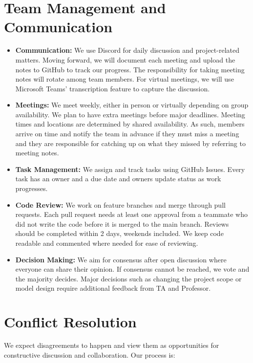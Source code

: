 \documentclass[12pt]{article}
\begin{document}
\section{Team Management and Communication}

\begin{itemize}
  \item \textbf{Communication:} We use Discord for daily discussion and project-related matters. Moving forward, we will document each meeting and upload the notes to GitHub to track our progress. The responsibility for taking meeting notes will rotate among team members. For virtual meetings, we will use Microsoft Teams’ transcription feature to capture the discussion.
  \item \textbf{Meetings:} We meet weekly, either in person or virtually depending on group availability.  We plan to have extra meetings before major deadlines. Meeting times and locations are determined by shared availability. As such, members arrive on time and notify the team in advance if they must miss a meeting and they are responsible for catching up on what they missed by referring to meeting notes.
  \item \textbf{Task Management:} We assign and track tasks using GitHub Issues. Every task has an owner and a due date and owners update status as work progresses.
  \item \textbf{Code Review:} We work on feature branches and merge through pull requests. Each pull request needs at least one approval from a teammate who did not write the code before it is merged to the main branch. Reviews should be completed within 2 days, weekends included. We keep code readable and commented where needed for ease of reviewing. 
  
  \item \textbf{Decision Making:} We aim for consensus after open discussion where everyone can share their opinion. If consensus cannot be reached, we vote and the majority decides. Major decisions such as changing the project scope or model design require additional feedback from TA and Professor. 
\end{itemize}

\section{Conflict Resolution}

We expect disagreements to happen and view them as opportunities for constructive discussion and collaboration. Our process is:
\end{document}
